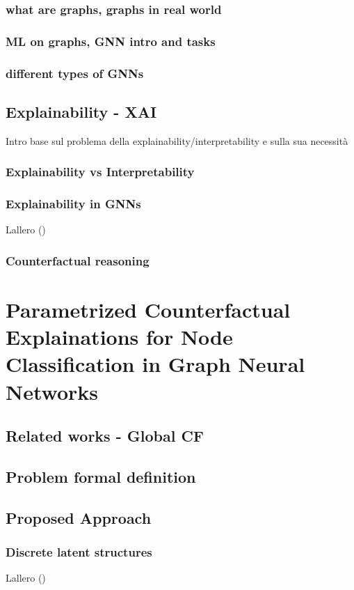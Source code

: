 \documentclass[binding=0.6cm,LaM]{sapthesis}
\newcommand{\mycite}[1]{(\cite{#1})}
\begin{document}
\subsection{what are graphs, graphs in real world}
\subsection{ML on graphs, GNN intro and tasks}
\subsection{different types of GNNs}

\section{Explainability - XAI}
\label{sec:xai}
Intro base sul problema della explainability/interpretability e sulla sua necessità
\subsection{Explainability vs Interpretability}
\subsection{Explainability in GNNs}
Lallero \mycite{ying2019gnnexplainer}
\subsection{Counterfactual reasoning}


\chapter{Parametrized Counterfactual Explainations for Node Classification in Graph Neural Networks}
\label{chap:3}
\section{Related works - Global CF}
\label{sec:gcf}
\section{Problem formal definition}
\label{sec:form-def}
\section{Proposed Approach}
\label{sec:cfpg}
\subsection{Discrete latent structures}
Lallero \mycite{Krizhevsky2009,cifair10,raunak-etal-2020-long}
\end{document}
